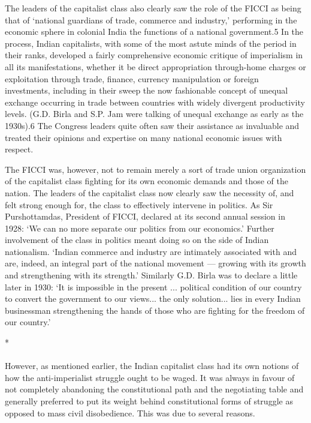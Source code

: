 The leaders of the capitalist class also clearly saw the role of the FICCI as being that of `national guardians of trade, commerce and industry,' performing in the economic sphere in colonial India the functions of a national government.5 In the process, Indian capitalists, with some of the most astute minds of the period in their ranks, developed a fairly comprehensive economic critique of imperialism in all its manifestations, whether it be direct appropriation through-home charges or exploitation through trade, finance, currency manipulation or foreign investments, including in their sweep the now fashionable concept of unequal exchange occurring in trade between countries with widely divergent productivity levels. (G.D. Birla and S.P. Jam were talking of unequal exchange as early as the 1930s).6 The Congress leaders quite often saw their assistance as invaluable and treated their opinions and expertise on many national economic issues with respect. 

The FICCI was, however, not to remain merely a sort of trade union organization of the capitalist class fighting for its own economic demands and those of the nation. The leaders of the capitalist class now clearly saw the necessity of, and felt strong enough for, the class to effectively intervene in politics. As Sir Purshottamdas, President of FICCI, declared at its second annual session in 1928: `We can no more separate our politics from our economics.' Further involvement of the class in politics meant doing so on the side of Indian nationalism. `Indian commerce and industry are intimately associated with and are, indeed, an integral part of the national movement --- growing with its growth and strengthening with its strength.' Similarly G.D. Birla was to declare a little later in 1930: `It is impossible in the present ... political condition of our country to convert the government to our views... the only solution... lies in every Indian businessman strengthening the hands of those who are fighting for the freedom of our country.'

\begin{center}*\end{center}

\paragraph*{}

However, as mentioned earlier, the Indian capitalist class had its own notions of how the anti-imperialist struggle ought to be waged. It was always in favour of not completely abandoning the constitutional path and the negotiating table and generally preferred to put its weight behind constitutional forms of struggle as opposed to mass civil disobedience. This was due to several reasons. 


